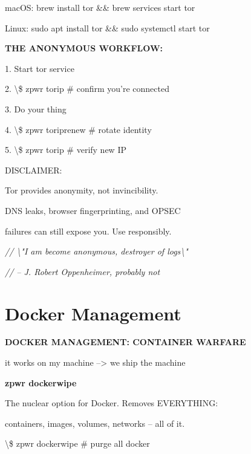 \documentclass[11pt,a4paper,twoside]{book}
\begin{document}
macOS:   brew install tor \&\& brew services start tor

Linux:   sudo apt install tor \&\& sudo systemctl start tor


\vspace{12pt}
{\bfseries\color{neonyellow} THE ANONYMOUS WORKFLOW:}\vspace{4pt}

1. Start tor service

2. \textbackslash{}\$ zpwr torip            \# confirm you're connected

3. Do your thing

4. \textbackslash{}\$ zpwr toriprenew       \# rotate identity

5. \textbackslash{}\$ zpwr torip            \# verify new IP

DISCLAIMER:

Tor provides anonymity, not invincibility.

DNS leaks, browser fingerprinting, and OPSEC

failures can still expose you. Use responsibly.

{\small\itshape\color{dimtext} // \textbackslash{}"I am become anonymous, destroyer of logs\textbackslash{}"}

{\small\itshape\color{dimtext} //   -- J. Robert Oppenheimer, probably not}


\vspace{16pt}

\section{Docker Management}


\vspace{10pt}
{\large\bfseries\color{neoncyan} DOCKER MANAGEMENT: CONTAINER WARFARE}\vspace{6pt}

it works on my machine --> we ship the machine


\vspace{12pt}
{\bfseries\color{neonyellow} zpwr dockerwipe}\vspace{4pt}

The nuclear option for Docker. Removes EVERYTHING:

containers, images, volumes, networks -- all of it.

\begin{codebox}
\textbackslash{}\$ zpwr dockerwipe             \# purge all docker\\
\end{codebox}
\end{document}
